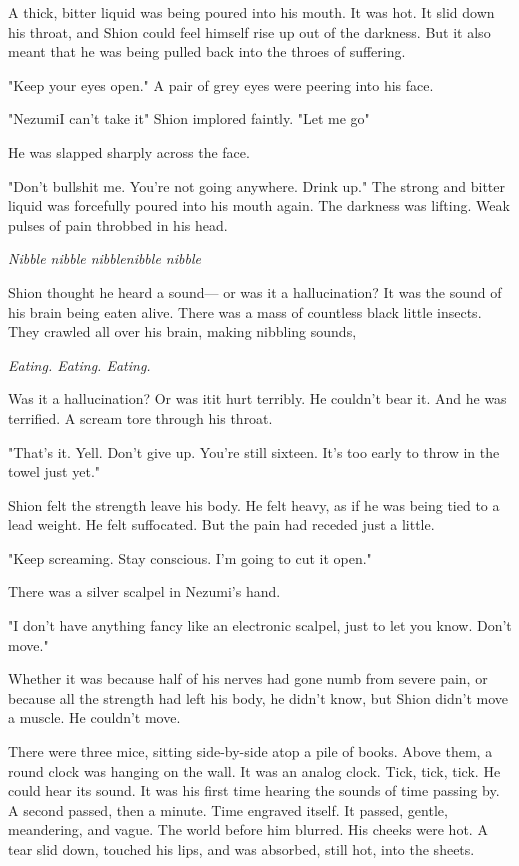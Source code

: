 A thick, bitter liquid was being poured into his mouth. It was hot. It
slid down his throat, and Shion could feel himself rise up out of the
darkness. But it also meant that he was being pulled back into the
throes of suffering.

"Keep your eyes open." A pair of grey eyes were peering into his face.

"Nezumi\el I can't take it\el " Shion implored faintly. "Let me go\el "

He was slapped sharply across the face.

"Don't bullshit me. You're not going anywhere. Drink up." The strong and
bitter liquid was forcefully poured into his mouth again. The darkness
was lifting. Weak pulses of pain throbbed in his head.

\emph{Nibble nibble nibble\el nibble nibble\el }

Shion thought he heard a sound--- or was it a hallucination? It was the
sound of his brain being eaten alive. There was a mass of countless
black little insects. They crawled all over his brain, making nibbling
sounds,

\emph{Eating. Eating. Eating.}

Was it a hallucination? Or was it\el it hurt terribly. He couldn't bear
it. And he was terrified. A scream tore through his throat.

"That's it. Yell. Don't give up. You're still sixteen. It's too early to
throw in the towel just yet."

Shion felt the strength leave his body. He felt heavy, as if he was
being tied to a lead weight. He felt suffocated. But the pain had
receded just a little.

"Keep screaming. Stay conscious. I'm going to cut it open."

There was a silver scalpel in Nezumi's hand.

"I don't have anything fancy like an electronic scalpel, just to let you
know. Don't move."

Whether it was because half of his nerves had gone numb from severe
pain, or because all the strength had left his body, he didn't know, but
Shion didn't move a muscle. He couldn't move.

There were three mice, sitting side-by-side atop a pile of books. Above
them, a round clock was hanging on the wall. It was an analog clock.
Tick, tick, tick. He could hear its sound. It was his first time hearing
the sounds of time passing by. A second passed, then a minute. Time
engraved itself. It passed, gentle, meandering, and vague. The world
before him blurred. His cheeks were hot. A tear slid down, touched his
lips, and was absorbed, still hot, into the sheets.

